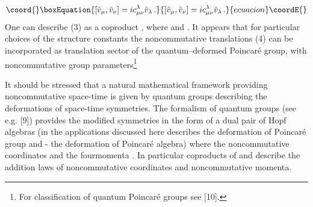 \documentclass[a4paper,a4paper]{article}
\begin{document}
\begin{equation}\coord{}\boxEquation{
\left[ \hat{v}_{\mu}, \hat{v}_{\nu}\right] 
= i c_{\mu\nu} ^{\lambda}
\hat{v}_{\lambda}\, .
}{
\left[ \hat{v}_{\mu}, \hat{v}_{\nu}\right] 
= i c_{\mu\nu} ^{\lambda}
\hat{v}_{\lambda}\, .
}{ecuacion}\coordE{}\end{equation}
One can describe (3) as a coproduct 
\coordHE{}, 
where
\coordHE{} and
\coordHE{}. It appears that for
particular choices of the structure constants
\coordHE{} the noncommutative translations (4) can
be incorporated as translation sector of the quantum--deformed
Poincar\'{e} group, with noncommutative group
parameters\footnote{For classification of quantum Poincar\'{e}
groups see [10].}

It should be stressed that a natural mathematical framework
providing noncommutative space-time is given by quantum groups
describing the deformations of space-time symmetries. The
formalism of quantum groups (see e.g. [9]) provides the modified 
 symmetries in
the form of a dual pair of Hopf algebras \coordHE{}
(in the applications discussed here \coordHE{} describes the deformation
 of Poincar\'{e} group \coordHE{} and
\coordHE{} - the deformation of Poincar\'{e} algebra) where the
 noncommutative coordinates \coordHE{} and the 
fourmomenta
\coordHE{}. In particular
 coproducts of \coordHE{} and \coordHE{} describe
 the addition laws of noncommutative coordinates and
noncommutative momenta. 
\end{document}

